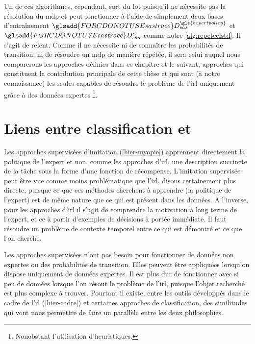 \documentclass[frenchb,a4paper,justified,notoc]{tufte-book}
\newcommand{\expertpolicy}{\gls{expertpolicy}}
\newcommand{\sastrace}[1]{\ensuremath{\glsadd{FORCDONOTUSEsastrace}D_{sas}^{#1}}}
\begin{document}
Un de ces algorithmes, cependant, sort du lot puisqu'il ne nécessite pas la résolution du \gls{mdp} et peut fonctionner à l'aide de simplement deux bases d'entraînement $\sastrace{\expertpolicy}$ et $\sastrace{\sim}$ comme notre \autoref{alg:repeteelstd}. Il s'agit de \gls{relent}. Comme il ne nécessite ni de connaître les probabilités de transition, ni de résoudre un \gls{mdp} de manière répétée, il sera celui auquel nous comparerons les approches définies dans ce chapitre et le suivant, approches qui constituent la contribution principale de cette thèse et qui sont (à notre connaissance) les seules capables de résoudre le problème de l'\gls{irl} uniquement grâce à des données expertes \footnote{Nonobstant l'utilisation d'heuristiques.
 }.
\section{Liens entre classification et }
\label{sec-5-1}
\label{hier-classifirl}


Les approches supervisées d'imitation (\autoref{hier-myopie}) apprennent directement la politique de l'expert et non, comme les approches d'\gls{irl}, une description succincte de la tâche sous la forme d'une fonction de récompense. L'imitation supervisée peut être vue comme moins problématique que l'\gls{irl}, disons certainement plus directe, puisque ce que ces méthodes cherchent à apprendre (la politique de l'expert) est de même nature que ce qui est présent dans les données. A l'inverse, pour les approches d'\gls{irl} il s'agit de comprendre la motivation à long terme de l'expert, et ce à partir d'exemples de décisions à portée immédiate. Il faut résoudre un problème de contexte temporel entre ce qui est démontré et ce que l'on cherche.

Les approches supervisées n'ont pas besoin pour fonctionner de données non expertes ou des probabilités de transition. Elles peuvent être appliquées lorsqu'on dispose uniquement de données expertes. Il est plus dur de fonctionner avec si peu de données lorsque l'on résout le problème de l'\gls{irl}, puisque l'objet recherché est plus complexe à trouver. Pourtant il existe, entre les outils développés dans le cadre de l'\gls{rl} (\autoref{hier-cadre}) et certaines approches de classification, des similitudes qui vont nous permettre de faire un parallèle entre les deux philosophies.
\end{document}
